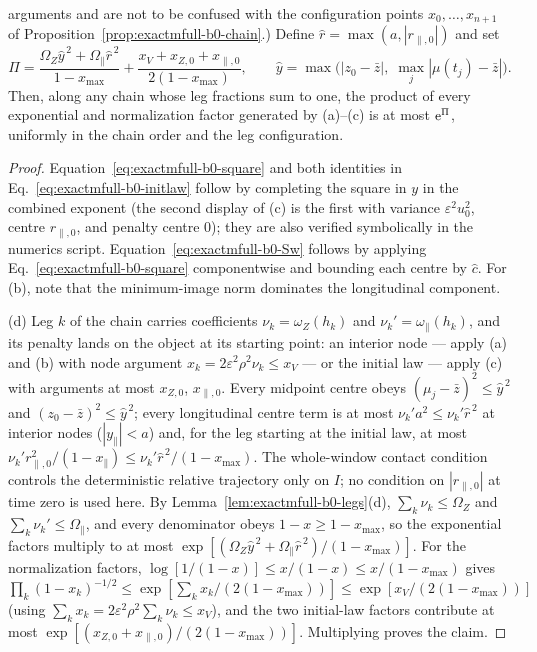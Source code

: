 \begin{lemma}
\begin{enumerate}
arguments and are not to be confused with the configuration points
\(x_0,\ldots,x_{n+1}\) of Proposition~\ref{prop:exactmfull-b0-chain}.)  Define
\(\hat r=\max(a,|r_{\parallel,0}|)\) and set
\begin{equation}
 \Pi
 =\frac{\Omega_Z\hat y^{\,2}+\Omega_\parallel\hat r^{\,2}}{1-x_{\max}}
 +\frac{x_V+x_{Z,0}+x_{\parallel,0}}{2(1-x_{\max})},
 \qquad
 \hat y=\max\bigl(|z_0-\bar z|,\;\max_j|\mu(t_j)-\bar z|\bigr).
 \label{eq:exactmfull-b0-Pi}
\end{equation}
Then, along any chain whose leg fractions sum to one, the product of every
exponential and normalization factor generated by (a)--(c) is at most
\(\mathrm e^{\Pi}\), uniformly in the chain order and the leg configuration.
\end{enumerate}
\end{lemma}

\begin{proof}
Equation~\eqref{eq:exactmfull-b0-square} and both identities in
Eq.~\eqref{eq:exactmfull-b0-initlaw} follow by completing the square in
\(y\) in the combined exponent (the second display of (c) is the first with
variance \(\varepsilon^2u_0^2\), centre \(r_{\parallel,0}\), and penalty
centre \(0\)); they are also verified symbolically in the numerics script.
Equation~\eqref{eq:exactmfull-b0-Sw} follows by applying
Eq.~\eqref{eq:exactmfull-b0-square} componentwise and bounding each centre
by \(\hat c\).  For (b), note that the minimum-image norm dominates the
longitudinal component.

(d)  Leg \(k\) of the chain carries coefficients
\(\nu_k=\omega_Z(h_k)\) and \(\nu_k'=\omega_\parallel(h_k)\), and its
penalty lands on the object at its starting point: an interior node ---
apply (a) and (b) with node argument
\(x_k=2\varepsilon^2\rho^2\nu_k\le x_V\) --- or the initial law ---
apply (c) with arguments at most \(x_{Z,0}\), \(x_{\parallel,0}\).  Every
midpoint centre obeys \((\mu_j-\bar z)^2\le\hat y^{\,2}\) and
 \((z_0-\bar z)^2\le\hat y^{\,2}\); every longitudinal centre term is at
 most \(\nu_k'a^2\le\nu_k'\hat r^{\,2}\) at interior nodes
 (\(|y_\parallel|<a\)) and, for the leg starting at the initial law, at most
 \(\nu_k'r_{\parallel,0}^2/(1-x_\parallel)
 \le\nu_k'\hat r^{\,2}/(1-x_{\max})\).
 The whole-window contact condition controls the deterministic relative
 trajectory only on \(I\); no condition on \(|r_{\parallel,0}|\) at time zero
 is used here.  By
Lemma~\ref{lem:exactmfull-b0-legs}(d),
\(\sum_k\nu_k\le\Omega_Z\) and
\(\sum_k\nu_k'\le\Omega_\parallel\), and every denominator obeys
\(1-x\ge1-x_{\max}\), so the exponential factors multiply to at most
 \(\exp[(\Omega_Z\hat y^{\,2}+\Omega_\parallel\hat r^{\,2})/(1-x_{\max})]\).  For
the normalization factors, \(\log[1/(1-x)]\le x/(1-x)\le x/(1-x_{\max})\)
gives
\(\prod_k(1-x_k)^{-1/2}
\le\exp[\sum_kx_k/(2(1-x_{\max}))]
\le\exp[x_V/(2(1-x_{\max}))]\)
(using \(\sum_kx_k=2\varepsilon^2\rho^2\sum_k\nu_k\le x_V\)), and the
two initial-law factors contribute at most
\(\exp[(x_{Z,0}+x_{\parallel,0})/(2(1-x_{\max}))]\).  Multiplying proves
the claim.
\end{proof}

